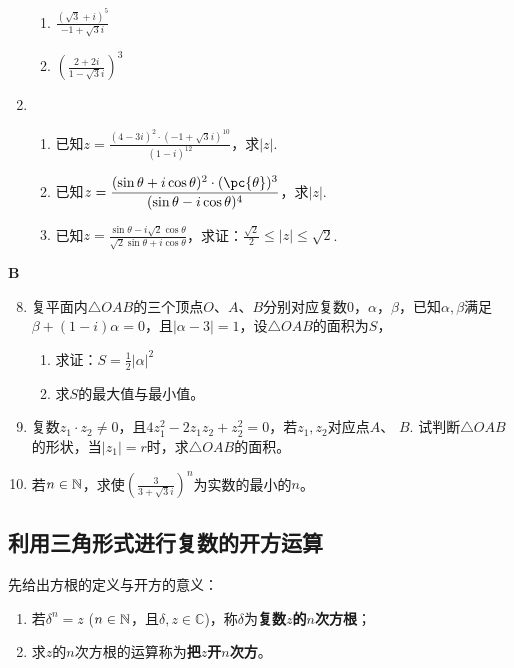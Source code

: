 \begin{enumerate}
\begin{multicols}{2}
\begin{enumerate}[(1)]
        \item $\frac{(\sqrt{3}+i)^5}{-1+\sqrt{3}i}$
        \item $\left(\frac{2+2i}{1-\sqrt{3}i}\right)^3$
    \end{enumerate}
\end{multicols}
    \item \begin{enumerate}[(1)]
        \item 已知$z=\frac{(4-3i)^2\cdot (-1+\sqrt{3}i)^{10}}{(1-i)^{12}}$，求$|z|$.
        \item 已知$z=\frac{(\sin\theta+i\cos\theta)^2\cdot (\pc{\theta})^3}{(\sin\theta-i\cos\theta)^4}$，求$|z|$.
        \item 已知$z=\frac{\sin\theta-i\sqrt{2}\cos\theta}{\sqrt{2}\sin\theta+i\cos\theta}$，求证：$\frac{\sqrt{2}}{2}\le |z|\le \sqrt{2}$.
    \end{enumerate}
\end{enumerate}

\begin{center}
    \bfseries B
    \end{center}
\begin{enumerate}\setcounter{enumi}{7}
    \item 复平面内$\triangle OAB$的三个顶点$O$、$A$、$B$分别对应复数0，$\alpha$，$\beta$，已知$\alpha,\beta$满足$\beta+(1-i)\alpha=0$，且$|\alpha-3|=1$，设$\triangle OAB$的面积为$S$，
\begin{enumerate}[(1)]
    \item 求证：$S=\frac{1}{2}|\alpha|^2$
    \item 求$S$的最大值与最小值。
\end{enumerate}

    \item 复数$z_1\cdot z_2\ne 0$，且$4z^2_1-2z_1z_2+z_2^2=0$，若$z_1,z_2$对应点$A$、
    $B$. 试判断$\triangle OAB$的形状，当$|z_1|=r$时，求$\triangle OAB$的面积。
    \item 若$n\in\mathbb{N}$，求使$\left(\frac{3}{3+\sqrt{3}i}\right)^n$为实数的最小的$n$。
\end{enumerate}

\subsection{利用三角形式进行复数的开方运算}
先给出方根的定义与开方的意义：
\begin{enumerate}[(1)]
\item 若$\delta^n=z$ ($n\in\mathbb{N}$，且$\delta,z\in\mathbb{C}$)，称$\delta$为\textbf{复数$z$的$n$次方根}；
\item 求$z$的$n$次方根的运算称为\textbf{把$z$开$n$次方}。
\end{enumerate}


